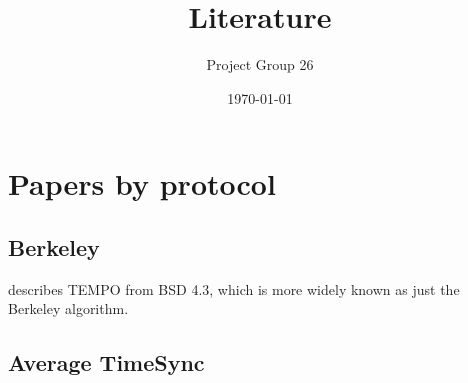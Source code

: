 \documentclass[11pt]{article}
\title{Literature}
\author{Project Group 26}
\date{\today}
\begin{document}
\section{Papers by protocol}

\subsection{Berkeley}
\cite{Gusella1989} describes TEMPO from BSD 4.3, which is more widely known as just the Berkeley algorithm.

\subsection{Average TimeSync}
\cite{SchenatoGamba2007} 

\nocite{*}
\printbibliography
\end{document}
